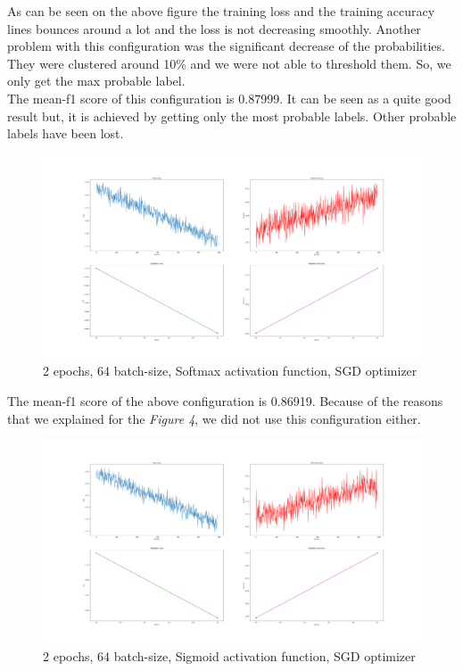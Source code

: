 \documentclass[12pt]{article}
\begin{document}
As can be seen on the above figure the training loss and the training accuracy lines bounces around a lot and the loss is not decreasing smoothly. Another problem with this configuration was the significant decrease of the probabilities. They were clustered around 10\% and we were not able to threshold them. So, we only get the max probable label. \\

The mean-f1 score of this configuration is 0.87999. It can be seen as a quite good result but, it is achieved by getting only the most probable labels. Other probable labels have been lost.

\begin{figure}[H]
\centering
\includegraphics[width=1\textwidth]{2ep_64btch_sgd_softmax.png}
\caption{2 epochs, 64 batch-size, Softmax activation function, SGD optimizer}
\end{figure}

The mean-f1 score of the above configuration is 0.86919. Because of the reasons that we explained for the \textit{Figure 4}, we did not use this configuration either.

\begin{figure}[H]
\centering
\includegraphics[width=1\textwidth]{2ep_64btch_sgd_sigmoid.png}
\caption{2 epochs, 64 batch-size, Sigmoid activation function, SGD optimizer}
\end{figure}
\end{document}
